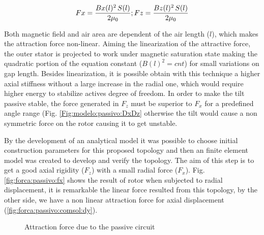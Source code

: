 \documentclass[10pt,fleqn,a4paper,twoside]{article}
\begin{document}
	\begin{equation}
			Fx = \frac{Bx(l)^2 \, S(l)}{2 \mu_0} ; \\
			Fz = \frac{Bz(l)^2 \, S(l)}{2 \mu_0}
			\label{eq:Force:virtualwork}
	\end{equation}
	
	
	Both magnetic field and air area are dependent of the air length ($l$), which makes the  attraction force non-linear.	Aiming the linearization of the attractive force, the outer stator is projected to work under magnetic saturation state making the quadratic portion of the equation constant ($B(l)^2 = cnt$) for small variations on gap length. Besides linearization, it is possible obtain with this technique a higher axial stiffness without a large increase in the radial one, which would require higher energy to stabilize actives degree of freedom. In order to make the tilt passive stable, the force generated in $F_z$ must be superior to $F_x $ for a predefined angle range (Fig. \ref{Fig:modelo:passivo:DxDz} otherwise the tilt would cause a non symmetric force on the rotor causing it to get unstable.
	
	By the development of an analytical model it was possible to choose initial construction parameters for this proposed topology and then an finite element model was created to develop and verify the topology. The aim of this step is to get a good axial rigidity ($F_z$) with a small  radial force ($F_x$). Fig. \ref{fig:forca:passivo:fx} shows the result of rotor when subjected to radial displacement, it is remarkable the linear force resulted from this topology, by the other side, we have a non linear attraction force for axial displacement (\ref{fig:forca:passivo:comsol:dy}).
	
		
	\begin{figure}[ht]
		\hfill
		\caption{Attraction force due to the passive circuit}
		\label{fig:forca:passivo}
	\end{figure}	
	
\end{document}
